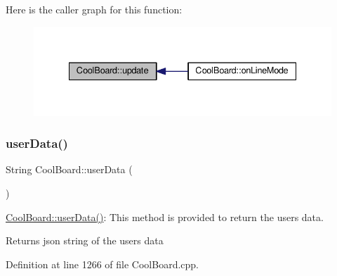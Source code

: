 Here is the caller graph for this function\+:
\nopagebreak
\begin{figure}[H]
\begin{center}
\leavevmode
\includegraphics[width=335pt]{d7/df9/class_cool_board_a8612756d3f73198cdde857a66f0fe690_icgraph}
\end{center}
\end{figure}
\mbox{\label{class_cool_board_ae7358fb6e623cfc81b775f5f1734909b}} 
\subsubsection{\texorpdfstring{user\+Data()}{userData()}}
{\footnotesize\ttfamily String Cool\+Board\+::user\+Data (\begin{DoxyParamCaption}{ }\end{DoxyParamCaption})}

\hyperlink{class_cool_board_ae7358fb6e623cfc81b775f5f1734909b}{Cool\+Board\+::user\+Data()}\+: This method is provided to return the user\textquotesingle{}s data.

\begin{DoxyReturn}{Returns}
json string of the user\textquotesingle{}s data 
\end{DoxyReturn}


Definition at line 1266 of file Cool\+Board.\+cpp.


